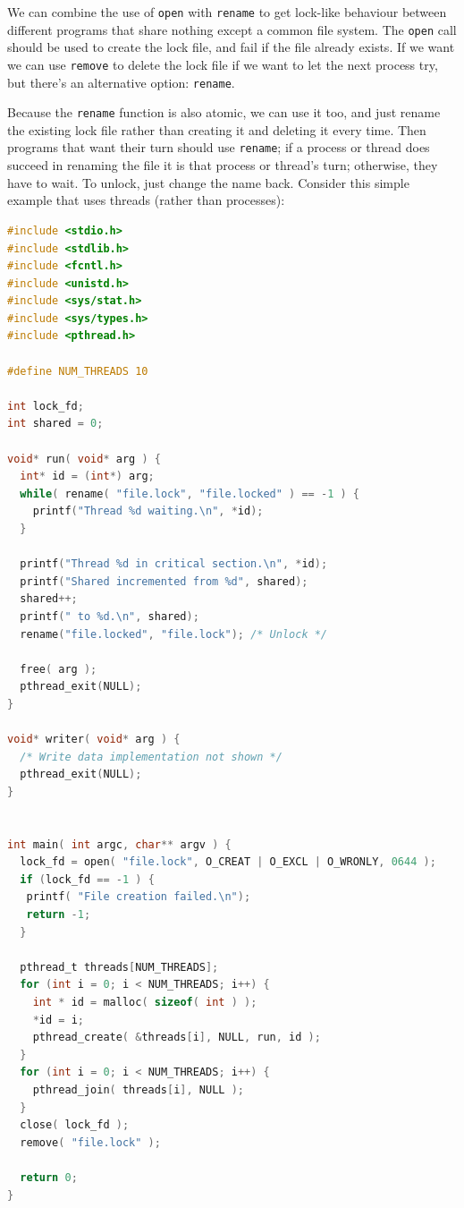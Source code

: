 We can combine the use of \texttt{open} with \texttt{rename} to get lock-like behaviour between different programs that share nothing except a common file system. The \texttt{open} call should be used to create the lock file, and fail if the file already exists. If we want we can use \texttt{remove} to delete the lock file if we want to let the next process try, but there's an alternative option: \texttt{rename}.

Because the \texttt{rename} function is also atomic, we can use it too, and just rename the existing lock file rather than creating it and deleting it every time. Then programs that want their turn should use \texttt{rename}; if a process or thread does succeed in renaming the file it is that process or thread's turn; otherwise, they have to wait. To unlock, just change the name back. Consider this simple example that uses threads (rather than processes):

\begin{lstlisting}[language=C]
#include <stdio.h>
#include <stdlib.h>
#include <fcntl.h>
#include <unistd.h>
#include <sys/stat.h>
#include <sys/types.h>
#include <pthread.h>

#define NUM_THREADS 10

int lock_fd;
int shared = 0;

void* run( void* arg ) {
  int* id = (int*) arg;
  while( rename( "file.lock", "file.locked" ) == -1 ) {
    printf("Thread %d waiting.\n", *id); 
  }

  printf("Thread %d in critical section.\n", *id);
  printf("Shared incremented from %d", shared);
  shared++;
  printf(" to %d.\n", shared);
  rename("file.locked", "file.lock"); /* Unlock */

  free( arg );
  pthread_exit(NULL);
}

void* writer( void* arg ) {
  /* Write data implementation not shown */
  pthread_exit(NULL);
}


int main( int argc, char** argv ) {
  lock_fd = open( "file.lock", O_CREAT | O_EXCL | O_WRONLY, 0644 );
  if (lock_fd == -1 ) {
   printf( "File creation failed.\n");
   return -1;
  }

  pthread_t threads[NUM_THREADS];
  for (int i = 0; i < NUM_THREADS; i++) {
    int * id = malloc( sizeof( int ) );
    *id = i;
    pthread_create( &threads[i], NULL, run, id );
  }
  for (int i = 0; i < NUM_THREADS; i++) {
    pthread_join( threads[i], NULL );
  }
  close( lock_fd );
  remove( "file.lock" );

  return 0;
}
\end{lstlisting}



